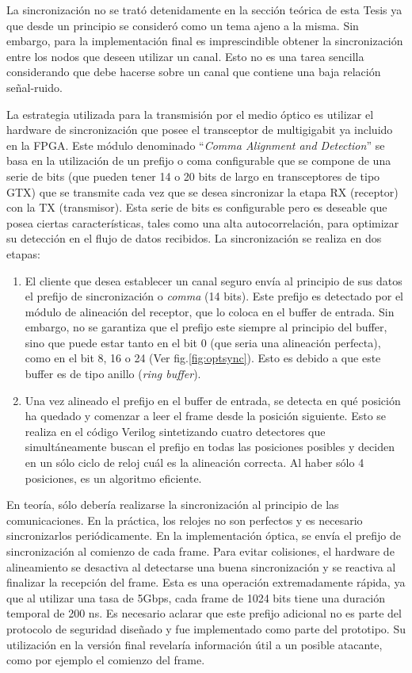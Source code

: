 La sincronización no se trató detenidamente en la sección teórica de esta Tesis ya que desde un principio se consideró como un tema ajeno a la misma. Sin embargo, para la implementación final es imprescindible obtener la sincronización entre los nodos que deseen utilizar un canal. Esto no es una tarea sencilla considerando que debe hacerse sobre un canal que contiene una baja relación señal-ruido.

La estrategia utilizada para la transmisión por el medio óptico es utilizar el hardware de sincronización que posee el transceptor de multigigabit ya incluido en la FPGA. Este módulo \cite{ug198} denominado ``\textit{Comma Alignment and Detection}'' se basa en la utilización de un prefijo o coma configurable que se compone de una serie de bits (que pueden tener 14 o 20 bits de largo en transceptores de tipo GTX) que se transmite cada vez que se desea sincronizar la etapa RX (receptor) con la TX (transmisor). Esta serie de bits es configurable pero es deseable que posea ciertas características, tales como una alta autocorrelación, para optimizar su detección en el flujo de datos recibidos.
La sincronización se realiza en dos etapas:
\begin{enumerate}
 \item El cliente que desea establecer un canal seguro envía al principio de sus datos el prefijo de sincronización o \textit{comma} (14 bits). Este prefijo es detectado por el módulo de alineación del receptor, que lo coloca en el buffer de entrada. Sin embargo, no se garantiza que el prefijo este siempre al principio del buffer, sino que puede estar tanto en el bit 0 (que seria una alineación perfecta), como en el bit 8, 16 o 24 (Ver fig.\ref{fig:optsync}). Esto es debido a que este buffer es de tipo anillo (\textit{ring buffer}).
 \item Una vez alineado el prefijo en el buffer de entrada, se detecta en qué posición ha quedado y comenzar a leer el frame desde la posición siguiente. Esto se realiza en el código Verilog sintetizando cuatro detectores que simultáneamente buscan el prefijo en todas las posiciones posibles y deciden en un sólo ciclo de reloj cuál es la alineación correcta. Al haber sólo 4 posiciones, es un algoritmo eficiente.
\end{enumerate}

En teoría, sólo debería realizarse la sincronización al principio de las comunicaciones. En la práctica, los relojes no son perfectos y es necesario sincronizarlos periódicamente. En la implementación óptica, se envía el prefijo de sincronización al comienzo de cada frame.
Para evitar colisiones, el hardware de alineamiento se desactiva al detectarse una buena sincronización y se reactiva al finalizar la recepción del frame. Esta es una operación extremadamente rápida, ya que al utilizar una tasa de 5Gbps, cada frame de 1024 bits tiene una duración temporal de 200 ns. Es necesario aclarar que este prefijo adicional no es parte del protocolo de seguridad diseñado y fue implementado como parte del prototipo. Su utilización en la versión final revelaría información útil a un posible atacante, como por ejemplo el comienzo del frame.

